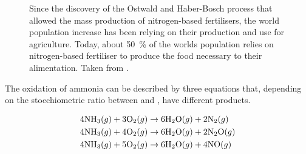 \begin{figure}[!htb]
\centering
    \caption{
    Since the discovery of the Ostwald and Haber-Bosch process that allowed the mass production of nitrogen-based fertilisers, the world population increase has been relying on their production and use for agriculture.
    Today, about \qty{50}{\percent} of the worlds population relies on nitrogen-based fertiliser to produce the food necessary to their alimentation.
    Taken from \cite{WorldDataFertilizer}.
    }
    \label{fig:FertilizerWID}
\end{figure}

The oxidation of ammonia can be described by three equations that, depending on the stoechiometric ratio between \ammonia and \dioxygen, have different products.

\begin{align}
    \label{eq:AmmoniaOxidationNitrogen}
    4 \ammonia (g) + 3 \dioxygen (g) & \rightarrow 6 \water (g) + 2 \nitrogen (g) \\
    \label{eq:AmmoniaOxidationNitrousOxide}
    4 \ammonia (g) + 4 \dioxygen (g) & \rightarrow 6 \water (g) + 2 \nitrousoxide (g) \\
    \label{eq:AmmoniaOxidationNitricOxide}
    4 \ammonia (g) + 5 \dioxygen (g) & \rightarrow 6 \water (g) + 4 \nitricoxide (g)
\end{align}

